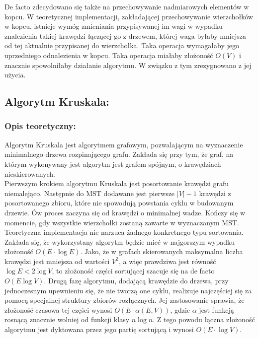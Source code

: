 \documentclass[a4paper,12pt]{article}
\begin{document}
\noindent
De facto zdecydowano się także na przechowywanie nadmiarowych elementów w kopcu. W teoretycznej implementacji, zakładającej przechowywanie wierzchołków w kopcu, istnieje wymóg zmieniania przypisywanej im wagi w wypadku znalezienia takiej krawędzi łączącej go z drzewem, której waga byłaby mniejsza od tej aktualnie przypisanej do wierzchołka. Taka operacja wymagałaby jego uprzedniego odnalezienia w kopcu. Taka operacja miałaby złożoność $O(V)$ i znacznie spowolniłaby działanie algorytmu. W związku z tym zrezygnowano z jej użycia.

\subsection{Algorytm Kruskala:}

\subsubsection{Opis teoretyczny:}
Algorytm Kruskala jest algorytmem grafowym, pozwalającym na wyznaczenie minimalnego drzewa rozpinającego grafu. Zakłada się przy tym, że graf, na którym wykonywany jest algorytm jest grafem spójnym, o krawędziach nieskierowanych.\\

\noindent
Pierwszym krokiem algorytmu Kruskala jest posortowanie krawędzi grafu niemalejąco. Następnie do MST dodawane jest pierwsze $|V|-1$ krawędzi z posortowanego zbioru, które nie spowodują powstania cyklu w budowanym drzewie. Ów proces zaczyna się od krawędzi o minimalnej wadze. Kończy się w momencie, gdy wszystkie wierzchołki zostaną zawarte w wyznaczanym MST. \\

\noindent
Teoretyczna implementacja nie narzuca żadnego konkretnego typu sortowania. Zakłada się, że wykorzystany algorytm będzie mieć w najgorszym wypadku złożoność $O(E \cdot \log E)$. Jako, że w grafach skierowanych maksymalna liczba krawędzi jest mniejsza od wartości $V^2$, a więc prawdziwa jest równość $\log E < 2\log V$, to złożoność części sortującej szacuje się na de facto $O (E \log V)$. Drugą fazę algorytmu, dodającą krawędzie do drzewa, przy jednoczesnym upewnieniu się, że nie tworzą one cyklu, realizuje najczęściej się za pomocą specjalnej struktury zbiorów rozłącznych. Jej zastosowanie sprawia, że złożoność czasowa tej części wynosi $O(E \cdot \alpha(E,V))$, gdzie $\alpha$ jest funkcją rosnącą znacznie wolniej od funkcji klasy $n \log n$. Z tego powodu łączna złożoność algorytmu jest dyktowana przez jego partię sortującą i wynosi $O (E \cdot \log V)$.
\end{document}
